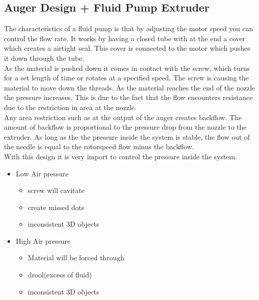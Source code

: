 \documentclass[11pt]{article}
\begin{document}
\newpage
 
 
\subsection{Auger Design + Fluid Pump Extruder}

 The  characteristics  of a fluid  pump  is  that by  adjusting  the  motor speed  you can control  the flow rate. It works by having a closed tube with at the end a cover which creates a airtight seal. This cover is connected to the motor which pushes it down through the tube.\\
 
  As the material is pushed down it comes in contact with the screw, which turns for a set length of time or rotates at a specified speed.  The screw is causing the material to move down the threads. As the material reaches the end of the nozzle the pressure  increases. This is due to the fact that the  flow  encounters resistance due to the restriction in area at the nozzle.\\
  
Any area restriction such as at the output of the auger creates backflow. The amount of backflow is proportional to the pressure drop from the nozzle to the extruder. As long as the the pressure inside the system is stable, the flow out of the needle is equal to the rotorspeed flow minus the backflow.   \\

With this design it is very import to control the pressure inside the system. 

\begin{itemize}
	\item Low Air pressure
	\begin{itemize}
		\item screw will cavitate
		\item create missed dots
		\item inconsistent 3D objects
	\end{itemize}
\end{itemize}

 \begin{itemize}
	\item High Air pressure
	\begin{itemize}
		\item Material will be forced through
		\item drool(excess of fluid)
		\item inconsistent 3D objects
	\end{itemize}
\end{itemize}
\end{document}
